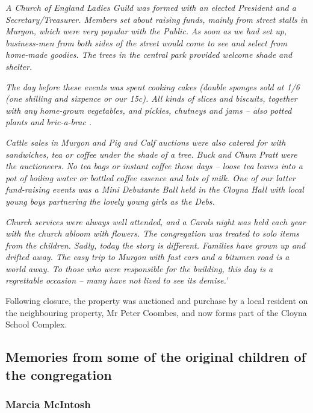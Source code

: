 \emph{A Church of England Ladies Guild was formed with an elected President and a Secretary/Treasurer. Members set about raising funds, mainly from street stalls in Murgon, which were very popular with the Public.} \emph{As soon as we had set up, business-men from both sides of the street would come to see and select from home-made goodies. The trees in the central park provided welcome shade and shelter.}



\emph{The day before these events was spent cooking cakes (double sponges sold at 1/6 (one shilling and sixpence or our 15c). All kinds of slices and biscuits, together with any home-grown vegetables, and pickles, chutneys and jams -- also potted plants and bric-a-brac .}



\emph{Cattle sales in Murgon and Pig and Calf auctions were also catered for with sandwiches, tea or coffee under the shade of a tree. Buck and Chum Pratt were the auctioneers. No tea bags or instant coffee those days -- loose tea leaves into a pot of boiling water or bottled coffee essence and lots of milk. One of our latter fund-raising events was a Mini Debutante Ball held in the Cloyna Hall with local young boys partnering the lovely young girls as the Debs.}



\emph{Church services were always well attended, and a Carols night was held each year with the church abloom with flowers. The congregation was treated to solo items from the children. Sadly, today the story is different. Families have grown up and drifted away. The easy trip to Murgon with fast cars and a bitumen road is a world away. To those who were responsible for the building, this day is a regrettable occasion -- many have not lived to see its demise.'}



Following closure, the property was auctioned and purchase by a local resident on the neighbouring property, Mr Peter Coombes, and now forms part of the Cloyna School Complex.



\subsection{Memories from some of the original children of the congregation}



\subsubsection{Marcia McIntosh}



